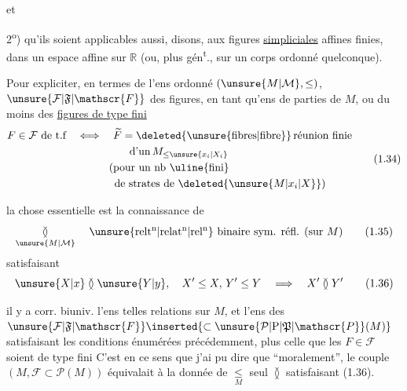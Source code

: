et

2\textsuperscript{o}) qu'ils soient applicables aussi, disons, aux figures \uline{simpliciales} affines finies, dans un espace affine sur $\mathbb{R}$ (ou, plus gén\textsuperscript{t}., sur un corps ordonné quelconque).

Pour expliciter, en termes de l'ens ordonné $(\unsure{M|\mathcal{M}},\leq)$,  $\unsure{\mathcal{F}|\mathfrak{F}|\mathscr{F}}$ des figures, en tant qu'ens de parties de $M$,  ou du moins des \uline{figures de type fini}
\[
\begin{aligned}
 F\in\mathcal{F}\ \text{de t.f} \quad&\Longleftrightarrow\quad
 \widetilde F=\deleted{\unsure{\text{fibres}|\text{fibre}}}\,\text{réunion finie}\\
 &\hspace{4.9em}\text{d'un}\,M_{\leq \unsure{x_i|X_i}}\\
 &\hspace{3.0em}\text{(pour un nb \uline{fini}}\\
 &\hspace{3.5em}\text{de strates de }\deleted{\unsure{M|x_i|X}}\text{)}
\end{aligned}
\tag*{(1.34)}
\]


la chose essentielle est la connaissance de
\[
\underset{\unsure{M|\mathcal{M}}}{\between}\quad\text{\unsure{relt\textsuperscript{n}|relat\textsuperscript{n}|rel\textsuperscript{n}} binaire sym. réfl. (sur }M\text{)}
\tag*{(1.35)}
\]
 satisfaisant
\[
\unsure{X|x}\between\unsure{Y|y},\quad X'\leq X,\,Y'\leq Y\quad\Longrightarrow\quad X'\between Y'
\tag*{(1.36)}
\]


il y a corr. biuniv.  l'ens  telles relations sur $M$, et l'ens des $\unsure{\mathcal{F}|\mathfrak{F}|\mathscr{F}}\inserted{\subset\unsure{\mathcal{P}|\mathrm{P}|\mathfrak{P}|\mathscr{P}}(M)}$ satisfaisant les conditions énumérées précédemment, plus celle que les $F\in\mathcal{F}$ soient  de type fini C'est en ce sens que j'ai pu dire que ``moralement'', le couple $(M,\mathcal{F}\subset\mathcal{P}(M))$ équivalait à  la donnée de $\underset{M}{\leqslant}$ seul  $\between$ satisfaisant (1.36).


